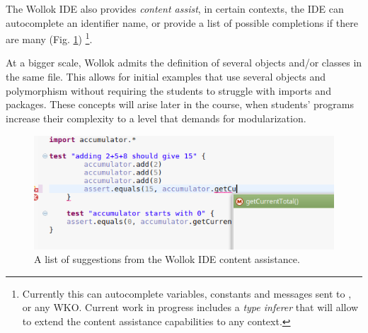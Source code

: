 The Wollok IDE also provides \emph{content assist}, 
\ie in certain contexts, the IDE can autocomplete an identifier name,
or provide a list of possible completions if there are many (\cf Fig. \ref{fig:codeCompletion})%
\footnote{Currently this can autocomplete variables, constants and messages sent to ,  or any WKO. 
Current work in progress includes a \emph{type inferer} that will allow to extend the content assistance capabilities to any context.}. 

At a bigger scale, Wollok admits the definition of several objects and/or classes in the same file. 
This allows for initial examples that use several objects and polymorphism 
without requiring the students to struggle with imports and packages.
These concepts will arise later in the course, 
when students' programs increase their complexity to a level that demands for modularization. 
 
\begin{figure}[ht]
\vspace{-2mm}
\centering
\includegraphics[scale=0.40]{images/codeCompletion.png}
\vspace{-2mm}
\caption{\small A list of suggestions from the Wollok IDE content assistance.}
\label{fig:codeCompletion}
\vspace{-5mm}
\end{figure}



